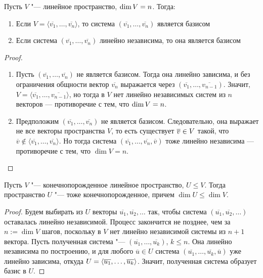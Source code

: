 \begin{proposition}
	Пусть $V$ "--- линейное пространство, $\dim{V} \hm{=} n$. Тогда:
	\begin{enumerate}
		\item Если $V = \langle\overline{v_1}, \dots, \overline{v_n}\rangle$, то система $(\overline{v_1}, \dots, \overline{v_n})$ является базисом
		\item Если система $(\overline{v_1}, \dots, \overline{v_n})$ линейно независима, то она является базисом
	\end{enumerate}
\end{proposition}

\begin{proof}~
	\begin{enumerate}
		\item Пусть $(\overline{v_1}, \dots, \overline{v_n})$ не является базисом. Тогда она линейно зависима, и без ограничения общности вектор $\overline{v_n}$ выражается через $(\overline{v_1}, \dots, \overline{v_{n - 1}})$. Значит, $V = \langle\overline{v_1}, \dots, \overline{v_{n - 1}}\rangle$, но тогда в $V$ нет линейно независимых систем из $n$ векторов --- противоречие с тем, что $\dim{V} \hm{=} n$.
		\item Предположим $(\overline{v_1}, \dots, \overline{v_n})$ не является базисом. Следовательно, она выражает не все векторы пространства $V$, то есть существует $\overline{v} \hm{\in} V$ такой, что $\overline{v} \not\in \langle\overline{v_1}, \dots, \overline{v_n}\rangle$. Но тогда система $(\overline{v_1},\dots,\overline{v_n},\overline{v})$ тоже линейно независима --- противоречие с тем, что $\dim{V} = n$.\qedhere
	\end{enumerate}
\end{proof}

\begin{proposition}
	Пусть $V$ "--- конечнопорожденное линейное пространство, $U \le V$. Тогда пространство $U$ "--- тоже конечнопорожденное, причем $\dim{U} \le \dim{V}$.
\end{proposition}

\begin{proof}
	Будем выбирать из $U$ векторы $\overline{u_1}, \overline{u_2}, \dots$ так, чтобы система $(\overline{u_1}, \overline{u_2}, \dots)$ оставалась линейно независимой. Процесс закончится не позднее, чем за $n := \dim{V}$ шагов, поскольку в $V$ нет линейно независимой системы из $n + 1$ вектора. Пусть полученная система "--- $(\overline{u_1}, \dots, \overline{u_k})$, $k \le n$. Она линейно независима по построению, и для любого $\overline{u} \in U$ система $(\overline{u_1}, \dots, \overline{u_k}, \overline{u})$ уже линейно зависима, откуда $U = \langle\overline{u_1}, \dots, \overline{u_k}\rangle$. Значит, полученная система образует базис в $U$.
\end{proof}

